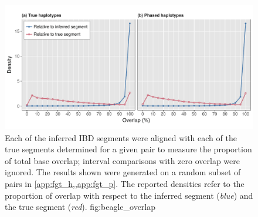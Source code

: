 

\begin{figure}[!htb]
\includegraphics[width=\textwidth]{./img/ch3/beagle_overlap}
{Each of the inferred IBD segments were aligned with each of the true segments determined for a given pair to measure the proportion of total base overlap; interval comparisons with zero overlap were ignored.
The results shown were generated on a random subset of  pairs in \cref{app:fgt_h,,app:fgt_p}.
The reported densities refer to the proportion of overlap with respect to the inferred segment (\emph{blue}) and the true segment (\emph{red}).\AdditionLabel}
{fig:beagle_overlap}
\end{figure}
